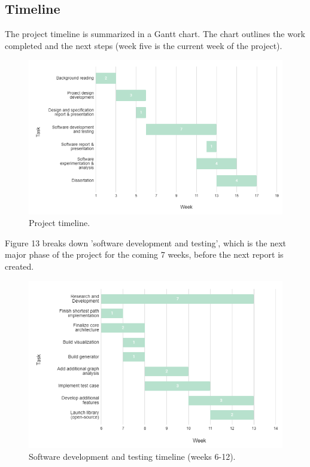 \begin{plan}
\subsection{Timeline}
The project timeline is summarized in a Gantt chart\cite{gantt}.
The chart outlines the work completed and the next steps (week five is the current week of the project).
\begin{figure}[h]
    \centering
    \includegraphics[scale=0.7]{images/timeline.PNG}
    \caption{Project timeline.}
\end{figure}
\clearpage
Figure 13 breaks down 'software development and testing', which is the next major phase of the project for the coming 7 weeks, before the next report is created.
\begin{figure}[h]
    \centering
    \includegraphics[scale=0.7]{images/dev_timeline.PNG}
    \caption{Software development and testing timeline (weeks 6-12).}
\end{figure}
\end{plan}
\vspace{1cm}
\clearpage
